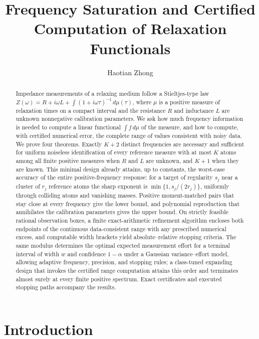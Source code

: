 \documentclass[10pt]{amsart}
\title[Frequency saturation and certified computation]{Frequency Saturation and Certified Computation of Relaxation Functionals}
\author{Haotian Zhong}
\date{}
\theoremstyle{definition}
\theoremstyle{remark}
\theoremstyle{plain}
\begin{document}
\begin{abstract}
Impedance measurements of a relaxing medium follow a Stieltjes-type law $Z(\omega)=R+i\omega L+\int(1+i\omega\tau)^{-1}\,d\mu(\tau)$, where $\mu$ is a positive measure of relaxation times on a compact interval and the resistance $R$ and inductance $L$ are unknown nonnegative calibration parameters. We ask how much frequency information is needed to compute a linear functional $\int f\,d\mu$ of the measure, and how to compute, with certified numerical error, the complete range of values consistent with noisy data. We prove four theorems. Exactly $K+2$ distinct frequencies are necessary and sufficient for uniform noiseless identification of every reference measure with at most $K$ atoms among all finite positive measures when $R$ and $L$ are unknown, and $K+1$ when they are known. This minimal design already attains, up to constants, the worst-case accuracy of the entire positive-frequency response: for a target of regularity $s_j$ near a cluster of $r_j$ reference atoms the sharp exponent is $\min\{1,s_j/(2r_j)\}$, uniformly through colliding atoms and vanishing masses. Positive moment-matched pairs that stay close at every frequency give the lower bound, and polynomial reproduction that annihilates the calibration parameters gives the upper bound. On strictly feasible rational observation boxes, a finite exact-arithmetic refinement algorithm encloses both endpoints of the continuous data-consistent range with any prescribed numerical excess, and computable width brackets yield absolute--relative stopping criteria. The same modulus determines the optimal expected measurement effort for a terminal interval of width $w$ and confidence $1-\alpha$ under a Gaussian variance--effort model, allowing adaptive frequency, precision, and stopping rules; a class-tuned expanding design that invokes the certified range computation attains this order and terminates almost surely at every finite positive spectrum. Exact certificates and executed stopping paths accompany the results.
\end{abstract}
\maketitle

\section{Introduction}\label{sec:intro}
\end{document}
